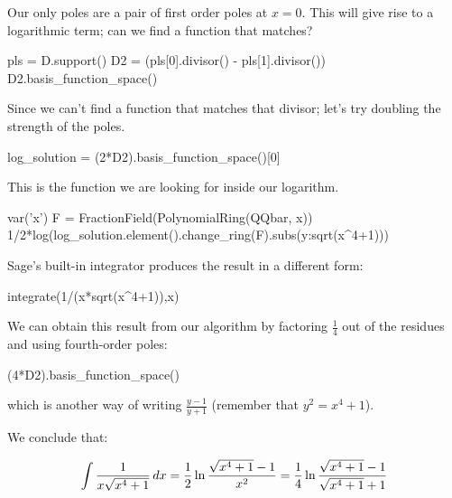 Our only poles are a pair of first order poles at $x=0$.  This will give rise to
a logarithmic term; can we find a function that matches?

\begin{sageblock}[geddes]
pls = D.support()
D2 = (pls[0].divisor() - pls[1].divisor())
D2.basis_function_space()
\end{sageblock}

Since we can't find a function that matches that divisor; let's try
doubling the strength of the poles.

\begin{sageblock}[geddes]
log_solution = (2*D2).basis_function_space()[0]
\end{sageblock}

This is the function we are looking for inside our logarithm.

\begin{sageblock}[geddes]
var('x')
F = FractionField(PolynomialRing(QQbar, x))
1/2*log(log_solution.element().change_ring(F).subs({y:sqrt(x^4+1)}))
\end{sageblock}

\begin{comment}
$$\int {1\over{x\sqrt{x^4+1}}} \, dx
   = {1\over2} \ln{{\sqrt{x^4+1}-1}\over{x^2}}$$
\end{comment}

Sage's built-in integrator produces the result in a different form:

\begin{sageblock}[geddes]
integrate(1/(x*sqrt(x^4+1)),x)
\end{sageblock}

We can obtain this result from our algorithm by factoring $\frac{1}{4}$ out
of the residues and using fourth-order poles:

\begin{sageblock}[geddes]
(4*D2).basis_function_space()
\end{sageblock}

which is another way of writing $\frac{y-1}{y+1}$ (remember
that $y^2 = x^4+1$).

We conclude that:

$$\int {1\over{x\sqrt{x^4+1}}} \, dx
={1\over2} \ln {{\sqrt{x^4+1}-1}\over{x^2}}
={1\over4} \ln {{\sqrt{x^4+1}-1}\over{\sqrt{x^4+1}+1}}$$

\endexample

